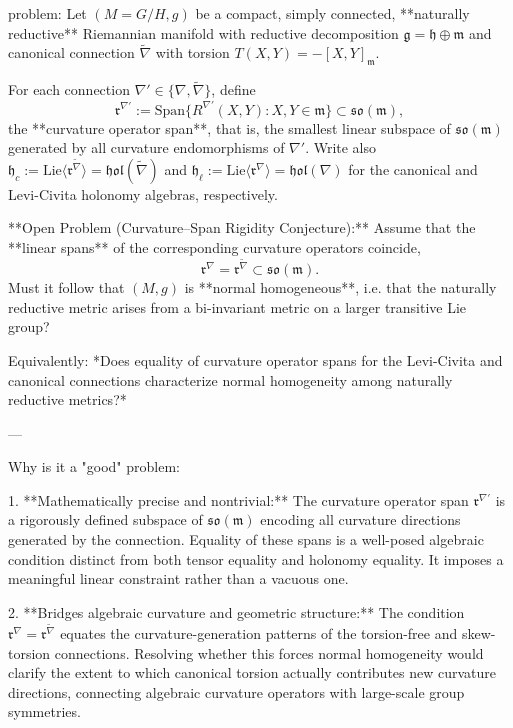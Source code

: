 problem:  
Let \( (M = G/H, g) \) be a compact, simply connected, **naturally reductive** Riemannian manifold with reductive decomposition \(\mathfrak{g} = \mathfrak{h} \oplus \mathfrak{m}\) and canonical connection \(\tilde{\nabla}\) with torsion \(T(X,Y) = -[X,Y]_{\mathfrak m}\).  

For each connection \( \nabla'\in\{\nabla,\tilde{\nabla}\}\), define  
\[
\mathfrak{r}^{\nabla'} := \mathrm{Span}\{ R^{\nabla'}(X,Y) : X,Y\in \mathfrak{m}\} \subset \mathfrak{so}(\mathfrak{m}),
\]
the **curvature operator span**, that is, the smallest linear subspace of \(\mathfrak{so}(\mathfrak{m})\) generated by all curvature endomorphisms of \(\nabla'\).  
Write also \(\mathfrak{h}_c := \mathrm{Lie}\langle \mathfrak{r}^{\tilde{\nabla}}\rangle = \mathfrak{hol}(\tilde{\nabla})\) and \(\mathfrak{h}_\ell := \mathrm{Lie}\langle \mathfrak{r}^{\nabla}\rangle = \mathfrak{hol}(\nabla)\) for the canonical and Levi-Civita holonomy algebras, respectively.

**Open Problem (Curvature–Span Rigidity Conjecture):**  
Assume that the **linear spans** of the corresponding curvature operators coincide,
\[
\mathfrak{r}^{\nabla} = \mathfrak{r}^{\tilde{\nabla}} \subset \mathfrak{so}(\mathfrak{m}).
\]
Must it follow that \((M,g)\) is **normal homogeneous**, i.e. that the naturally reductive metric arises from a bi-invariant metric on a larger transitive Lie group?

Equivalently: *Does equality of curvature operator spans for the Levi-Civita and canonical connections characterize normal homogeneity among naturally reductive metrics?*

---

Why is it a "good" problem:  

1. **Mathematically precise and nontrivial:**  
   The curvature operator span \(\mathfrak{r}^{\nabla'}\) is a rigorously defined subspace of \(\mathfrak{so}(\mathfrak{m})\) encoding all curvature directions generated by the connection. Equality of these spans is a well-posed algebraic condition distinct from both tensor equality and holonomy equality. It imposes a meaningful linear constraint rather than a vacuous one.

2. **Bridges algebraic curvature and geometric structure:**  
   The condition \(\mathfrak{r}^{\nabla} = \mathfrak{r}^{\tilde{\nabla}}\) equates the curvature-generation patterns of the torsion-free and skew-torsion connections. Resolving whether this forces normal homogeneity would clarify the extent to which canonical torsion actually contributes new curvature directions, connecting algebraic curvature operators with large-scale group symmetries.


